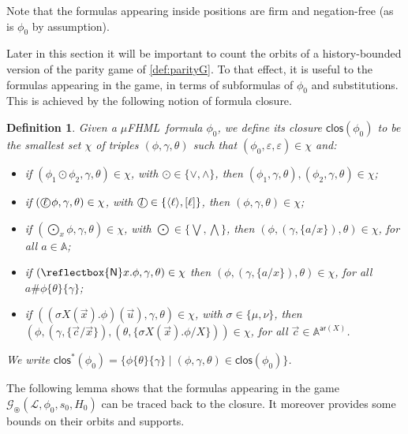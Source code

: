 \documentclass[10pt,a4paper]{article}
\newtheorem{definition}[theorem]{Definition}
\theoremstyle{definition}
\theoremstyle{remark}
\newcommand\modal[1]{{\bigcirc\mspace{-13mu}#1}\ }
\newcommand\new[0]{\reflectbox{\ensuremath{\mathsf{N}}}}
\newcommand\fresh[1]{\new #1.}
\newcommand\fhml[0]{$\mu$FHML}
\newcommand\diam[1]{\langle#1\rangle}
\newcommand\sq[1]{[#1]}
\newcommand\Gcal{\mathcal{G}}
\newcommand\Lcal{\mathcal{L}}
\newcommand\Atoms{\mathbb{A}}
\newcommand\ar{\mathsf{ar}}
\newcommand{\clos}[0]{\mathsf{clos}}
\newcommand\fgame[0]{\Gcal_\circledast}
\begin{document}
Note that the formulas appearing inside positions are firm and negation-free (as is $\phi_0$ by assumption). 


Later in this section it will be important to count the orbits of a history-bounded version of the parity game of \cref{def:parityG}. To that effect, it is useful to the formulas appearing in the game, in terms of subformulas of $\phi_0$ and substitutions. This is achieved by the following notion of formula closure. 
  
\begin{definition}\label{def:closFresh}
    Given a \fhml\ formula $\phi_0$, we define its closure $\clos(\phi_0)$ to be the smallest set $\chi$ of triples $(\phi,\gamma,\theta)$ such that $(\phi_0,\varepsilon,\varepsilon) \in \chi$ and:
    \begin{itemize}
        \item if $(\phi_1 \odot \phi_2, \gamma,\theta) \in \chi$, with $\odot\in\{\lor,\land\}$, then $(\phi_1, \gamma,\theta), (\phi_2, \gamma,\theta) \in \chi$;
        \item if $(\modal{\ell}\phi, \gamma,\theta) \in \chi$, with $\modal{l}\in\{\diam{\ell},\sq{\ell}\}$, then $(\phi, \gamma,\theta) \in \chi$;
        \item if $(\bigodot_x\phi, \gamma,\theta) \in \chi$, with $\bigodot\in\{\bigvee,\bigwedge\}$,           then $(\phi,(\gamma,\{a/x\}),\theta) \in \chi$, for all $a\in\Atoms$;
        \item if $(\fresh{x}\phi,\gamma, \theta) \in \chi$
          then $(\phi,(\gamma,\{a/x\}), \theta) \in \chi$, for all $a\#\phi\{\theta\}\{\gamma\}$;
        \item if $((\sigma X(\vec x).\phi)(\vec u),\gamma, \theta) \in \chi$, with $\sigma\in\{\mu,\nu\}$, then $(\phi,(\gamma,\{\vec c/\vec x\}), (\theta,\{\sigma X(\vec x).\phi / X\}))\in\chi$, for all $\vec c \in \Atoms^{\ar(X)}$.
            \end{itemize}
    We write $\clos^*(\phi_0) = \{\phi\{\theta\}\{\gamma\}\mid (\phi,\gamma, \theta) \in \clos(\phi_0)\}$.
\end{definition}

The following lemma shows that the formulas appearing in the game $\fgame(\Lcal,\phi_0, s_0,H_0)$ can be traced back to the closure. It moreover provides some bounds on their orbits and supports. 
\end{document}

